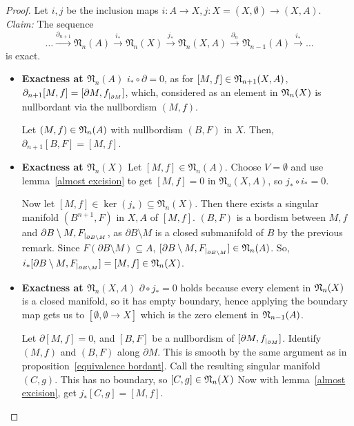 \documentclass[a4paper,11pt]{article}
\begin{document}
\begin{proof}\cite{dieck}
    Let \(i,j\) be the inclusion maps \(i:A\to X, j:X=(X,\emptyset)\to(X,A)\).\\
    \textit{Claim:} The sequence
    \[\dots\xrightarrow{\partial_{n+1}}\mathfrak{N}_n(A)\xrightarrow{i_\ast}\mathfrak{N}_n(X)\xrightarrow{j_\ast}\mathfrak{N}_n(X,A)\xrightarrow{\partial_n}\mathfrak{N}_{n-1}(A)\xrightarrow{i_\ast}\dots\]
    is exact.
    \begin{itemize}
        \item \textbf{Exactness at \(\mathfrak{N}_n(A)\)}
        \(i_\ast\circ \partial=0\), as for \([M,f]\in\mathfrak{N}_{n+1}(X,A)\), \(\partial_{n+1} [M,f]=[\partial M,f_{|_{\partial M}}]\), which, considered as an element in \(\mathfrak{N}_n(X)\) is nullbordant via the nullbordism \((M,f)\).

        Let \((M,f)\in\mathfrak{N}_n(A)\) with nullbordism \((B,F)\) in \(X\). Then, \(\partial_{n+1}[B,F]=[M,f]\).

        \item \textbf{Exactness at \(\mathfrak{N}_n(X)\)} Let \([M,f]\in\mathfrak{N}_n(A)\). Choose \(V=\emptyset\) and use lemma\ \ref{almost excision} to get \([M,f]=0\) in \(\mathfrak{N}_n(X,A)\), so \(j_\ast\circ i_\ast=0\).
        
        Now let \([M,f]\in\ker(j_\ast)\subseteq \mathfrak{N}_n(X)\). Then there exists a singular manifold \((B^{n+1},F)\) in \(X,A\) of \([M,f]\). \((B,F)\) is a bordism between \(M,f\) and \(\partial B\setminus M,F_{|_{\partial B\setminus M}}\), as \(\partial B\setminus M\) is a closed submanifold of \(B\) by the previous remark. Since \(F(\partial B\setminus M)\subseteq A\), \([\partial B\setminus M,F_{|_{\partial B\setminus M}}]\in\mathfrak{N}_n(A)\). So, \(i_\ast[\partial B\setminus M,F_{|_{\partial B\setminus M}}]=[M,f]\in\mathfrak{N}_n(X)\).

        \item \textbf{Exactness at \(\mathfrak{N}_n(X,A)\)} \(\partial \circ j_\ast=0\) holds because every element in \(\mathfrak{N}_n(X)\) is a closed manifold, so it has empty boundary, hence applying the boundary map gets us to \([\emptyset,\emptyset\to X]\) which is the zero element in \(\mathfrak{N}_{n-1}(A)\).
        
        Let \(\partial[M,f]=0\), and \([B,F]\) be a nullbordism of \([\partial M, f_{|_{\partial M}}]\). Identify \((M,f)\) and \((B,F)\) along \(\partial M\). This is smooth by the same argument as in proposition\ \ref{equivalence bordant}. Call the resulting singular manifold \((C,g)\). This has no boundary, so \([C,g]\in\mathfrak{N}_n(X)\) Now with lemma\ \ref{almost excision}, get \(j_\ast[C,g]=[M,f]\).
    \end{itemize}
\end{proof}
\end{document}
